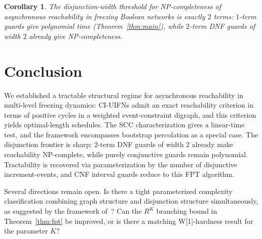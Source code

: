 \documentclass[final,3p,times]{elsarticle}
\newtheorem{corollary}[theorem]{Corollary}
\theoremstyle{definition}
\theoremstyle{remark}
\begin{document}
\begin{corollary}\label{cor:threshold}
The disjunction-width threshold for NP-completeness of asynchronous reachability in freezing Boolean networks is exactly $2$ terms: $1$-term guards give polynomial time (Theorem~\ref{thm:main}), while $2$-term DNF guards of width $2$ already give NP-completeness.
\end{corollary}

\section{Conclusion}

We established a tractable structural regime for asynchronous reachability in multi-level freezing dynamics: CI-UIFNs admit an exact reachability criterion in terms of positive cycles in a weighted event-constraint digraph, and this criterion yields optimal-length schedules.
The SCC characterization gives a linear-time test, and the framework encompasses bootstrap percolation as a special case.
The disjunction frontier is sharp: $2$-term DNF guards of width $2$ already make reachability NP-complete, while purely conjunctive guards remain polynomial.
Tractability is recovered via parameterization by the number of disjunctive increment-events, and CNF interval guards reduce to this FPT algorithm.

Several directions remain open.
Is there a tight parameterized complexity classification combining graph structure and disjunction structure simultaneously, as suggested by the framework of~\cite{goles2024parameterized}?
Can the $R^K$ branching bound in Theorem~\ref{thm:fpt} be improved, or is there a matching W[1]-hardness result for the parameter $K$?



\end{document}
